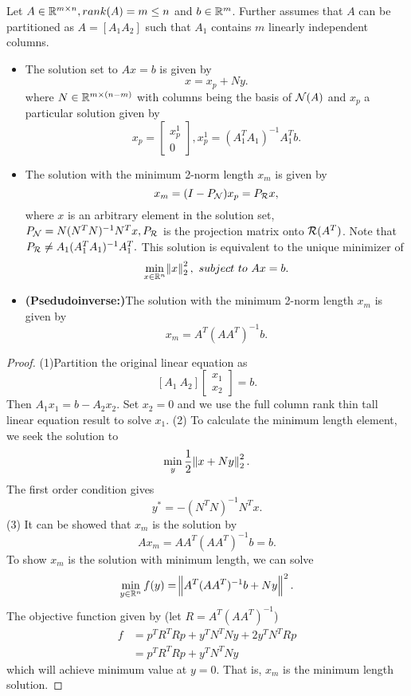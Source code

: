\begin{refsection}
\begin{lemma}\label{ch:linearalgebra:th:linearEquationSolutionMethodFatShortMatrixFullRowRank}
	Let $A\in \mathbb{R}^{m\times n},rank(A) = m\leq n$ and $b\in \mathbb{R}^m$. Further assumes that $A$ can be partitioned as $A = [A_1 A_2]$ such that $A_1$ contains $m$ linearly independent columns.
\begin{itemize}
	\item The solution set to $Ax = b$ is given by 
	$$x = x_p + Ny.$$
	where $N\in \mathbb{R}^{m\times (n-m)}$ with columns being the basis of $\mathcal{N}(A)$ and $x_p$ a particular solution given by
	$$x_p = \begin{bmatrix}
	x_p^1 \\ 0
	\end{bmatrix},x_p^1 = (A_1^TA_1)^{-1}A_1^Tb.$$
	\item The solution with the minimum 2-norm length $x_m$ is given by
	$$x_m = (I - P_{\mathcal{N}})x_p = P_{\mathcal{R}} x, $$
	where $x$ is an arbitrary element in the solution set, $P_{\mathcal{N}} = N(N^TN)^{-1}N^Tx, P_{\mathcal{R}}$ is the projection matrix onto $\mathcal{R}(A^T)$. Note that $P_{\mathcal{R}} \neq A_1(A_1^TA_1)^{-1}A_1^T.$
	This solution is equivalent to the unique minimizer of 
	$$\min_{x\in\mathbb{R}^n} \norm{x}_2^2, ~subject~to~ Ax = b.$$
	\item \textbf{(Psedudoinverse:)}The solution with the minimum 2-norm length $x_m$ is given by
	$$x_m = A^T(AA^T)^{-1}b.$$
\end{itemize}	
\end{lemma}
\begin{proof}
(1)Partition the original linear equation as
$$[A_1 ~ A_2] \begin{bmatrix}
x_1 \\
x_2
\end{bmatrix} = b.$$
Then $A_1x_1 = b - A_2x_2$. Set $x_2 = 0$ and we use the full column rank thin tall linear equation result to solve $x_1$.
(2) To calculate the minimum length element, we seek the solution to 
$$\min_{y} \frac{1}{2}\norm{x + Ny}_2^2.$$
The first order condition gives
$$y^* =-(N^TN)^{-1}N^Tx.$$
(3) It can be showed that $x_m$ is the solution by
$$Ax_m = AA^T(AA^T)^{-1}b = b.$$
To show $x_m$ is the solution with minimum length, we can solve
$$\min_{y\in\mathbb{R}^n} f(y) = \norm{A^T(AA^T)^{-1}b + Ny}^2.$$
The objective function given by (let $R = A^T(AA^T)^{-1}$)
\begin{align*}
f &= p^TR^TRp + y^TN^TNy + 2y^TN^TRp \\
&=p^TR^TRp + y^TN^TNy 
\end{align*}
which will achieve minimum value at $y = 0$. That is, $x_m$ is the minimum length solution.
\end{proof}




\end{refsection}
